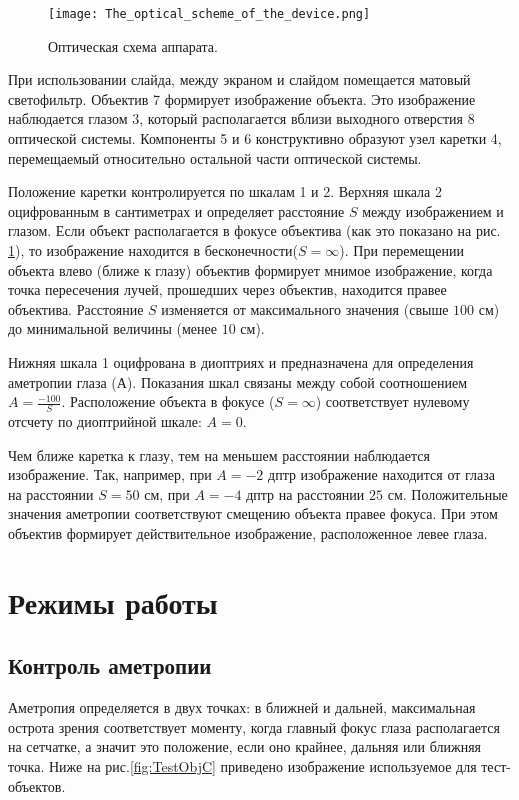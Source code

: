 \begin{figure}[ht]
	\centering
     \texttt{[image: The\_optical\_scheme\_of\_the\_device.png]}
	\caption{Оптическая схема аппарата.}
	\label{fig:OpticSche}
\end{figure}

При использовании слайда, между экраном и слайдом помещается матовый светофильтр. Объектив 7 формирует изображение объекта. Это изображение наблюдается глазом 3, который располагается вблизи выходного отверстия 8 оптической системы. Компоненты 5 и 6 конструктивно образуют узел каретки 4, перемещаемый относительно остальной части оптической системы. 

Положение каретки контролируется по шкалам 1 и 2. Верхняя шкала 2 оцифрованным в сантиметрах и определяет расстояние $S$ между изображением и глазом. Если объект располагается в фокусе объектива (как это показано на рис. \ref{fig:OpticSche}), то изображение находится в бесконечности($ S=\infty $). При перемещении объекта влево (ближе к глазу) объектив формирует мнимое изображение, когда точка пересечения лучей, прошедших через объектив, находится правее объектива. Расстояние $S$ изменяется от максимального значения (свыше $100$ см) до минимальной величины (менее $10$ см).

Нижняя шкала 1 оцифрована в диоптриях и предназначена для определения аметропии глаза (А). Показания шкал связаны между собой соотношением $ A=\frac{-100}{S}$. Расположение объекта в фокусе  ($ S=\infty $) соответствует нулевому отсчету по диоптрийной шкале: $A=0$.

Чем ближе каретка к глазу, тем на меньшем расстоянии наблюдается изображение. Так, например, при $A=-2$ дптр изображение находится от глаза на расстоянии $S=50$ см, при $A =-4$ дптр на расстоянии $25$ см.
Положительные значения аметропии соответствуют смещению объекта правее фокуса. При этом объектив формирует действительное изображение, расположенное левее глаза.

\section{Режимы работы}
\subsection{Контроль аметропии}
Аметропия определяется в двух точках: в ближней и дальней, максимальная острота зрения соответствует моменту, когда главный фокус глаза располагается на сетчатке, а значит это положение, если оно крайнее, дальняя или ближняя точка. Ниже на рис.\ref{fig:TestObjC} приведено изображение используемое для тест-объектов.

